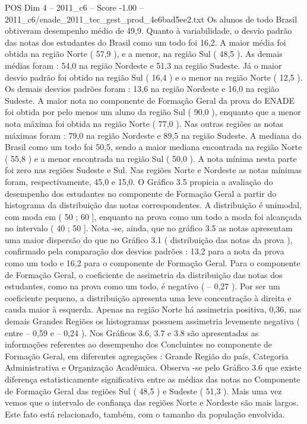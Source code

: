 \begin{textsample}{POS Dim 4 – 2011\_c6 – Score -1.00 – 2011\_c6/enade\_2011\_tec\_gest\_prod\_4e6bad5ee2.txt}
Os alunos de todo Brasil obtiveram desempenho médio de 49,9.
Quanto à variabilidade, o desvio padrão das notas dos estudantes do Brasil como um todo foi 16,2.
A maior média foi obtida na região Norte ( 57,9 ), e a menor, na região Sul ( 48,5 ).
As demais médias foram : 54,0 na região Nordeste e 51,3 na região Sudeste.
Já o maior desvio padrão foi obtido na região Sul ( 16,4 ) e o menor na região Norte ( 12,5 ).
Os demais desvios padrões foram : 13,6 na região Nordeste e 16,0 na região Sudeste.
A maior nota no componente de Formação Geral da prova do ENADE foi obtida por pelo menos um aluno da região Sul ( 90,0 ), enquanto que a menor nota máxima foi obtida na região Norte ( 77,0 ).
Nas outras regiões as notas máximas foram : 79,0 na região Nordeste e 89,5 na região Sudeste.
A mediana do Brasil como um todo foi 50,5, sendo a maior mediana encontrada na região Norte ( 55,8 ) e a menor encontrada na região Sul ( 50,0 ).
A nota mínima nesta parte foi zero nas regiões Sudeste e Sul.
Nas regiões Norte e Nordeste as notas mínimas foram, respectivamente, 45,0 e 15,0.
O Gráfico 3.5 propicia a avaliação do desempenho dos estudantes no componente de Formação Geral a partir do histograma da distribuição das notas correspondentes.
A distribuição é unimodal, com moda em ( 50 ; 60 ], enquanto na prova como um todo a moda foi alcançada no intervalo ( 40 ; 50 ].
Nota -se, ainda, que no gráfico 3.5 as notas apresentam uma maior dispersão do que no Gráfico 3.1 ( distribuição das notas da prova ), confirmado pela comparação dos desvios padrões : 13,2 para a nota da prova como um todo e 16,2 para o componente de Formação Geral.
Para o componente de Formação Geral, o coeficiente de assimetria da distribuição das notas dos estudantes, como na prova como um todo, é negativo ( – 0,27 ).
Por ser um coeficiente pequeno, a distribuição apresenta uma leve concentração à direita e cauda maior à esquerda.
Apenas na região Norte há assimetria positiva, 0,36, nas demais Grandes Regiões os histogramas possuem assimetria levemente negativa ( entre – 0,59 e – 0,24 ).
Nos Gráficos 3.6, 3.7 e 3.8 são apresentadas as informações referentes ao desempenho dos Concluintes no componente de Formação Geral, em diferentes agregações : Grande Região do país, Categoria Administrativa e Organização Acadêmica.
Observa -se pelo Gráfico 3.6 que existe diferença estatisticamente significativa entre as médias das notas no Componente de Formação Geral das regiões Sul ( 48,5 ) e Sudeste ( 51,3 ).
Mais uma vez vemos que o intervalo de confiança das regiões Norte e Nordeste são mais largos.
Este fato está relacionado, também, com o tamanho da população envolvida.

\end{textsample}
